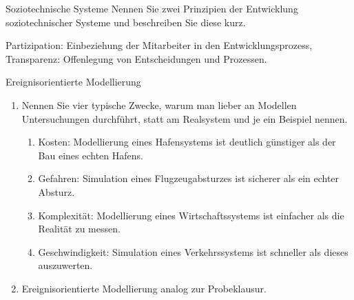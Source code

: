 \documentclass{article}
\begin{document}
\begin{exercise}{Soziotechnische Systeme}
  Nennen Sie zwei Prinzipien der Entwicklung soziotechnischer Systeme und beschreiben Sie diese kurz.

  \begin{solution}
    Partizipation: Einbeziehung der Mitarbeiter in den Entwicklungsprozess, Transparenz: Offenlegung von Entscheidungen und Prozessen.
  \end{solution}
\end{exercise}



\begin{exercise}{Ereignisorientierte Modellierung}
  \begin{enumerate}
    \item Nennen Sie vier typische Zwecke, warum man lieber an Modellen Untersuchungen durchführt, statt am Realsystem und je ein Beispiel nennen.
          \begin{solution}
            \begin{enumerate}
              \item Kosten: Modellierung eines Hafensystems ist deutlich günstiger als der Bau eines echten Hafens.
              \item Gefahren: Simulation eines Flugzeugabsturzes ist sicherer als ein echter Absturz.
              \item Komplexität: Modellierung eines Wirtschaftssystems ist einfacher als die Realität zu messen.
              \item Geschwindigkeit: Simulation eines Verkehrssystems ist schneller als dieses auszuwerten.
            \end{enumerate}
          \end{solution}

    \item Ereignisorientierte Modellierung analog zur Probeklausur.
  \end{enumerate}
\end{exercise}
\end{document}
